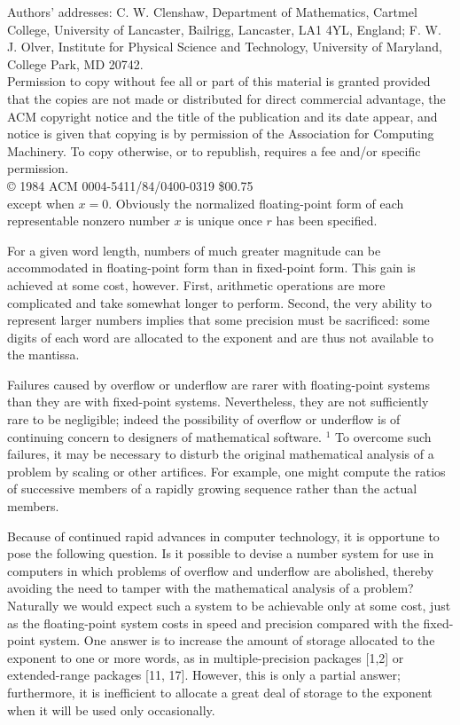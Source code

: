 \documentclass[10pt]{article}
\begin{document}
Authors' addresses: C. W. Clenshaw, Department of Mathematics, Cartmel College, University of Lancaster, Bailrigg, Lancaster, LA1 4YL, England; F. W. J. Olver, Institute for Physical Science and Technology, University of Maryland, College Park, MD 20742.\\
Permission to copy without fee all or part of this material is granted provided that the copies are not made or distributed for direct commercial advantage, the ACM copyright notice and the title of the publication and its date appear, and notice is given that copying is by permission of the Association for Computing Machinery. To copy otherwise, or to republish, requires a fee and/or specific permission.\\
© 1984 ACM 0004-5411/84/0400-0319 \$00.75\\
except when $x=0$. Obviously the normalized floating-point form of each representable nonzero number $x$ is unique once $r$ has been specified.

For a given word length, numbers of much greater magnitude can be accommodated in floating-point form than in fixed-point form. This gain is achieved at some cost, however. First, arithmetic operations are more complicated and take somewhat longer to perform. Second, the very ability to represent larger numbers implies that some precision must be sacrificed: some digits of each word are allocated to the exponent and are thus not available to the mantissa.

Failures caused by overflow or underflow are rarer with floating-point systems than they are with fixed-point systems. Nevertheless, they are not sufficiently rare to be negligible; indeed the possibility of overflow or underflow is of continuing concern to designers of mathematical software. ${ }^{1}$ To overcome such failures, it may be necessary to disturb the original mathematical analysis of a problem by scaling or other artifices. For example, one might compute the ratios of successive members of a rapidly growing sequence rather than the actual members.

Because of continued rapid advances in computer technology, it is opportune to pose the following question. Is it possible to devise a number system for use in computers in which problems of overflow and underflow are abolished, thereby avoiding the need to tamper with the mathematical analysis of a problem? Naturally we would expect such a system to be achievable only at some cost, just as the floating-point system costs in speed and precision compared with the fixed-point system. One answer is to increase the amount of storage allocated to the exponent to one or more words, as in multiple-precision packages [1,2] or extended-range packages [11, 17]. However, this is only a partial answer; furthermore, it is inefficient to allocate a great deal of storage to the exponent when it will be used only occasionally.
\end{document}

